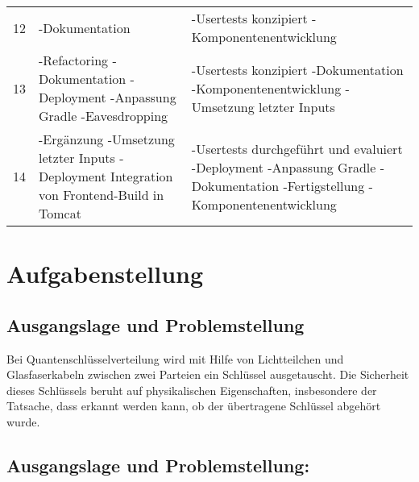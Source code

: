 \begin{longtable}{p{1cm}p{6cm}p{6cm}}
12 & -Dokumentation & -Usertests konzipiert \newline -Komponentenentwicklung\\
13 & -Refactoring \newline -Dokumentation \newline -Deployment \newline -Anpassung Gradle \newline -Eavesdropping & -Usertests konzipiert \newline -Dokumentation \newline -Komponentenentwicklung \newline -Umsetzung letzter Inputs\\
14 & -Ergänzung \newline -Umsetzung letzter Inputs \newline -Deployment \newline Integration von Frontend-Build in Tomcat & -Usertests durchgeführt und evaluiert  \newline -Deployment \newline -Anpassung Gradle \newline -Dokumentation \newline -Fertigstellung \newline -Komponentenentwicklung
\end{longtable}



\section{Aufgabenstellung}
\subsection{Ausgangslage und Problemstellung}
Bei Quantenschlüsselverteilung wird mit Hilfe von Lichtteilchen und Glasfaserkabeln zwischen zwei Parteien ein Schlüssel ausgetauscht. Die Sicherheit dieses Schlüssels beruht auf physikalischen Eigenschaften, insbesondere der Tatsache, dass erkannt werden kann, ob der übertragene Schlüssel abgehört wurde.
\subsection{Ausgangslage und Problemstellung:}

